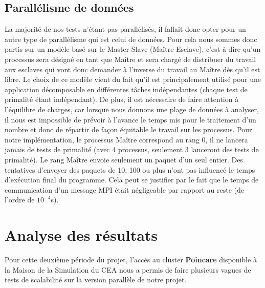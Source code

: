 		\subsection{Parallélisme de données}
		La majorité de nos tests n'étant pas parallélisés, il fallait donc opter pour un autre type de parallélisme qui est celui de données. Pour cela nous sommes donc partis sur un modèle basé sur le Master Slave (Maître-Esclave), c'est-à-dire qu'un processus sera désigné en tant que Maître et sera chargé de distribuer du travail aux esclaves qui vont donc demander à l'inverse du travail au Maître dès qu'il est libre. Le choix de ce modèle vient du fait qu'il est principalement utilisé pour une application décomposable en différentes tâches indépendantes (chaque test de primalité étant indépendant). De plus, il est nécessaire de faire attention à l'équilibre de charges, car lorsque nous donnons une plage de données à analyser, il nous est impossible de prévoir à l'avance le temps mis pour le traitement d'un nombre et donc de répartir de façon équitable le travail sur les processus. 
Pour notre implémentation, le processus Maître correspond au rang 0, il ne lancera jamais de tests de primalité (avec 4 processus, seulement 3 lanceront des tests de primalité). Le rang Maître envoie seulement un paquet d'un seul entier. Des tentatives d'envoyer des paquets de 10, 100 ou plus n'ont pas influencé le temps d'exécution final du programme. Cela peut se justifier par le fait que le temps de communication d'un message MPI était négligeable par rapport au reste (de l'ordre de $10^{-4}$s).

	\section{Analyse des résultats}
	Pour cette deuxième période du projet, l'accès au cluster \textbf{Poincare}\cite{poincare} disponible à la Maison de la Simulation du CEA nous a permis de faire plusieurs vagues de tests de scalabilité sur la version parallèle de notre projet.
	
